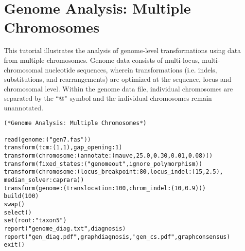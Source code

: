 
\section{Genome Analysis: Multiple Chromosomes}{\label{tutorial11}}

This tutorial illustrates the analysis of genome-level transformations 
using data from multiple chromosomes. Genome data consists of 
multi-locus, multi-chromosomal nucleotide sequences, wherein 
transformations (i.e. indels, substitutions, and rearrangements) 
are optimized at the sequence, locus and chromosomal level.  Within 
the genome data file, individual chromosomes are separated by the 
``$@$'' symbol and the individual chromosomes remain unannotated.

\begin{verbatim}
(*Genome Analysis: Multiple Chromosomes*)

read(genome:("gen7.fas"))
transform(tcm:(1,1),gap_opening:1)
transform(chromosome:(annotate:(mauve,25.0,0.30,0.01,0.08)))
transform(fixed_states:("genomeout",ignore_polymorphism))
transform(chromosome:(locus_breakpoint:80,locus_indel:(15,2.5),
median_solver:caprara))
transform(genome:(translocation:100,chrom_indel:(10,0.9)))
build(100)
swap()
select()
set(root:"taxon5")
report("genome_diag.txt",diagnosis)
report("gen_diag.pdf",graphdiagnosis,"gen_cs.pdf",graphconsensus)
exit()
\end{verbatim}

